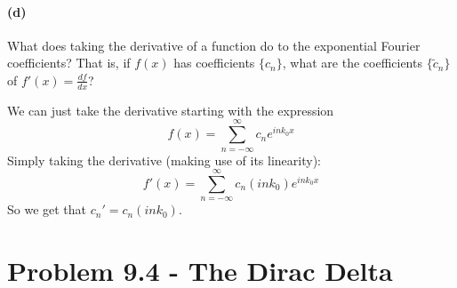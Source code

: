 \documentclass{article}
\begin{document}
\paragraph{(d)}
What does taking the derivative of a function do to the exponential Fourier coefficients?  That is, if $f(x)$ has coefficients $\{c_{n}\}$, what are the coefficients
$\{\tilde{c}_{n}\}$ of $f'(x) = \frac{df}{dx}$?

\begin{solution}
	We can just take the derivative starting with the expression
	\[
		f(x) = \sum_{n =-\infty}^{\infty} c_n e^{in k_0x}
	\] 
	Simply taking the derivative (making use of its linearity):
	\[
		f'(x) = \sum_{n = -\infty}^\infty c_n (ink_0) e^{ink_0x}
	\] 
	So we get that $c_{n}' = c_n (ink_0)$.
\end{solution}

\bigskip
\dphline
\pagebreak
\section*{Problem 9.4 - The Dirac Delta}
\end{document}
